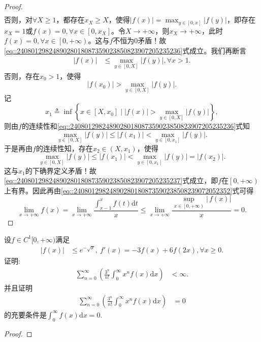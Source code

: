 \documentclass[../../main.tex]{subfiles}
\begin{document}
\begin{proof}
\begin{align}
\end{align}
否则，对$\forall X\geqslant 1$，都存在$x_X\geqslant X$，使得$\left| f\left( x \right) \right|=\max_{y\in \left[ 0,x \right]} \left| f\left( y \right) \right|$，即存在$x_X=1$或$f\left( x \right) =0,\forall x\in \left[ 0,x_X \right]$。令$X\rightarrow +\infty$，则$x_X\rightarrow +\infty$，此时$f\left( x \right) =0,\forall x\in \left[ 0,+\infty \right)$。这与$f$不恒为$0$矛盾！故\eqref{eq::2408012982489028018087359023850823907205235236}式成立。我们再断言
\begin{align}
\left| f\left( x \right) \right| &\leqslant \max_{y\in \left[ 0,X \right]} \left| f\left( y \right) \right|,\forall x>1. \label{eq::2408012982489028018087359023850823907205235237}
\end{align}
否则，存在$x_0>1$，使得
\[
\left| f\left( x_0 \right) \right|>\max_{y\in \left[ 0,X \right]} \left| f\left( y \right) \right|.
\]
记
\[
x_1\triangleq \inf\left\{ x\in \left[ X,x_0 \right] \mid \left| f\left( x \right) \right|>\max_{y\in \left[ 0,X \right]} \left| f\left( y \right) \right| \right\},
\]
则由$f$的连续性和\eqref{eq::2408012982489028018087359023850823907205235236}式知
\[
\max_{y\in \left[ 0,X \right]} \left| f\left( y \right) \right|\leqslant \left| f\left( x_1 \right) \right|<\max_{y\in \left[ 0,x_1 \right]} \left| f\left( y \right) \right|.
\]
于是再由$f$的连续性知，存在$x_2\in \left( X,x_1 \right)$，使得
\[
\max_{y\in \left[ 0,X \right]} \left| f\left( y \right) \right|\leqslant \left| f\left( x_1 \right) \right|<\max_{y\in \left[ 0,x_1 \right]} \left| f\left( y \right) \right|=\left| f\left( x_2 \right) \right|.
\]
这与$x_1$的下确界定义矛盾！故\eqref{eq::2408012982489028018087359023850823907205235237}式成立，即$f$在$\left[ 0,+\infty \right)$上有界。因此再由\eqref{eq::24080129824890280180873590238508239072052352}式可得
\[
\lim_{x\rightarrow +\infty} f\left( x \right) =\lim_{x\rightarrow +\infty} \frac{\int_{x-1}^x{f\left( t \right) \mathrm{d}t}}{x}\leqslant \lim_{x\rightarrow +\infty} \frac{\sup\limits_{x\in \left[ 0,+\infty \right)} \left| \,f\left( x \right) \right|}{x}=0.
\]
\end{proof}

\begin{example}
设$f \in C^1[0,+\infty)$满足
\begin{align*}
|f(x)| &\leqslant e^{-\sqrt{x}}, \ f'(x) = -3f(x) + 6f(2x), \forall x \geqslant 0.
\end{align*}
证明:
\begin{align*}
\sum_{n=0}^{\infty} \left( \frac{3^n}{n!} \int_{0}^{\infty} x^n f(x) \mathrm{d}x \right) &< \infty.
\end{align*}
并且证明
\begin{align*}
\sum_{n=0}^{\infty} \left( \frac{3^n}{n!} \int_{0}^{\infty} x^n f(x) \mathrm{d}x \right) &= 0
\end{align*}
的充要条件是$\int_{0}^{\infty} f(x) \mathrm{d}x = 0$.
\end{example}
\begin{proof}

\end{proof}
\end{document}
